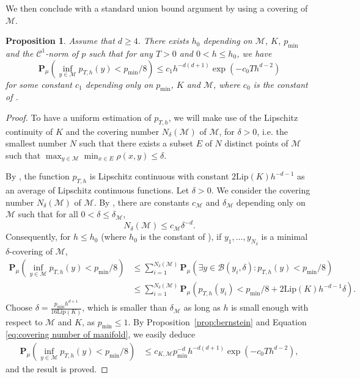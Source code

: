 \documentclass[10pt,a4paper]{article}
\renewcommand{\P}{{\mathbf P}}
\newcommand\cB{\mathcal{B}}
\newcommand\cC{\mathcal{C}}
\newcommand\cM{\mathcal{M}}
\newcommand{\PAR}[1]{{{\left(#1\right)}}} %
\newtheorem{proposition}[theorem]{Proposition}
\begin{document}
We then conclude with a standard union bound argument by using a covering of $\cM$.
	\begin{proposition}\label{prop:proba-invariante-unif}
 Assume that $d\ge 4$. There exists $h_0$ depending on $\cM$, $K$,  $p_{\min}$ and  the $\cC^1$-norm of $p$ such that  for any $T>0$ and $0<h\le h_0$, we have
\[
 \P_{\mu}\PAR{\inf_{y\in \cM}p_{T,h}(y)<p_{\min}/8 } \le c_1 h^{-d(d+1)} \exp\PAR{- c_0 T h^{d-2} }
\]
for some constant $c_1$ depending only on $p_{\min}$, $K$ and $\cM$, where $c_0$ is the constant of .
	\end{proposition} 
\begin{proof}
		To have a uniform estimation of $p_{T,h}$, we will make use of the Lipschitz continuity of $K$ and the covering number $N_{\delta}(\cM)$ of $\cM$, for $\delta>0$, i.e. the smallest number $N$ such that there exists a subset $E$ of $N$ distinct points of $\cM$ such that  $\max_{y \in \cM} \min_{x\in E}\rho(x,y) \le \delta$.

 By , the function $p_{T,h}$ is Lipschitz continuous with constant $2\mathrm{Lip}(K) h^{-d-1}$ as an average of Lipschitz continuous functions. 
Let $\delta>0$. We consider the covering number $N_{\delta}(\cM)$ of $\cM$.
By \cite[2.2A]{Gromov1981},  there are constants $c_{\cM}$ and $\delta_{\cM}$ depending only on $\cM$ such that for all $0<\delta\le \delta_{\cM}$,
\begin{equation}\label{eq:covering number of manifold}
N_{\delta}(\cM) \le c_{\cM}  \delta^{-d}.
\end{equation}
Consequently, for $h\le h_0$ (where $h_0$ is the constant of ), if $y_1,\dots,y_{N_{\delta}}$ is a minimal $\delta$-covering of $\cM$,
 \begin{align*}
 \P_{\mu}\PAR{ \inf_{ y\in\cM} p_{T,h}(y) <p_{\min}/8  }&\le\sum_{i=1}^{N_{\delta }(\cM)}
\P_{\mu}\PAR{ \exists y\in\cB(y_i,\delta ):p_{T,h}(y) <p_{\min}/8   }\\
&\le\sum_{i=1}^{N_{\delta }(\cM)}
\P_{\mu}\PAR{ p_{T,h}(y_i) <p_{\min}/8+2\mathrm{Lip}(K) h^{-d-1} \delta  }.
\end{align*}
Choose $\delta =\frac{p_{\min}h^{d+1}} {16\mathrm{Lip}(K)}$, which is smaller than $\delta_{\cM}$ as long as $h$ is small enough with respect to $\cM$ and $K$, as $p_{\min}\le 1$. 
By Proposition~\ref{prop:bernstein} and Equation \eqref{eq:covering number of manifold}, we easily deduce
 \begin{align*}
  \P_{\mu}(\inf_{y\in \cM}p_{T,h}(y)<p_{\min}/8)&\le c_{K,\cM}p_{\min}^{-d}  h^{-d(d+1)}\exp\PAR{- c_0 T h^{d-2} },
\end{align*}
and the result is proved.
\end{proof}
\end{document}
